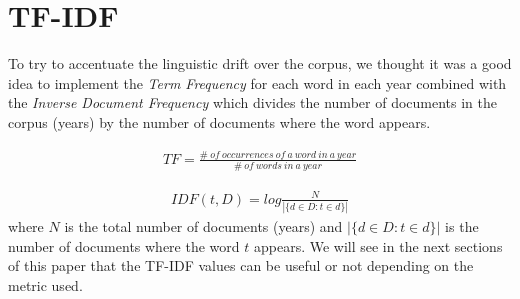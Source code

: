 \section{TF-IDF}

To try to accentuate the linguistic drift over the corpus, we thought it was a good idea to implement the \emph{Term Frequency} for each word in each year combined with the \emph{Inverse Document Frequency} which divides the number of documents in the corpus (years) by the number of documents where the word appears.

\begin{eqnarray}
    TF = \frac{\# \ of \ occurrences \ of \ a \ word \ in \ a \ year}{\# \ of \ words \ in \ a \ year}
\end{eqnarray}

\begin{eqnarray}
    IDF(t,D) = log \frac{N}{|\{d \in D : t \in d\}|}
\end{eqnarray}
where $N$ is the total number of documents (years) and $|\{d \in D : t \in d\}|$ is the number of documents where the word $t$ appears. We will see in the next sections of this paper that the TF-IDF values can be useful or not depending on the metric used.